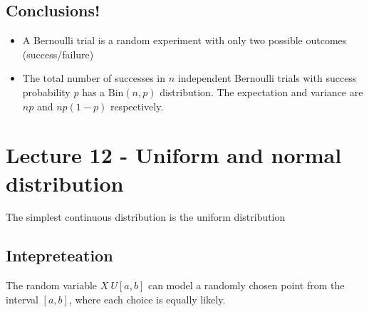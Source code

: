 \documentclass{report}
\theoremstyle{definition}
\newtheorem{definition}{Definition}
\theoremstyle{plain}
\newtheorem{theorem}{Theorem}
\theoremstyle{remark}
\begin{document}
\subsection{Conclusions!}
\begin{itemize}
  \item A Bernoulli trial is a random experiment with only two possible
    outcomes (success/failure)
  \item The total number of successes in $ n $ independent Bernoulli trials
    with success probability $ p $ has a $ \text{Bin}(n,p) $ distribution. The
    expectation and variance are $ np $ and $ np(1-p) $ respectively.
\end{itemize}
\section{Lecture 12 - Uniform and normal distribution}
The simplest continuous distribution is the uniform distribution
\begin{center}
\end{center}

\subsection{Intepreteation}
The random variable $ X~U[a,b] $ can model a randomly chosen point from the
interval $ [a,b] $, where each choice is equally likely.

\begin{center}
\end{center}
\end{document}
